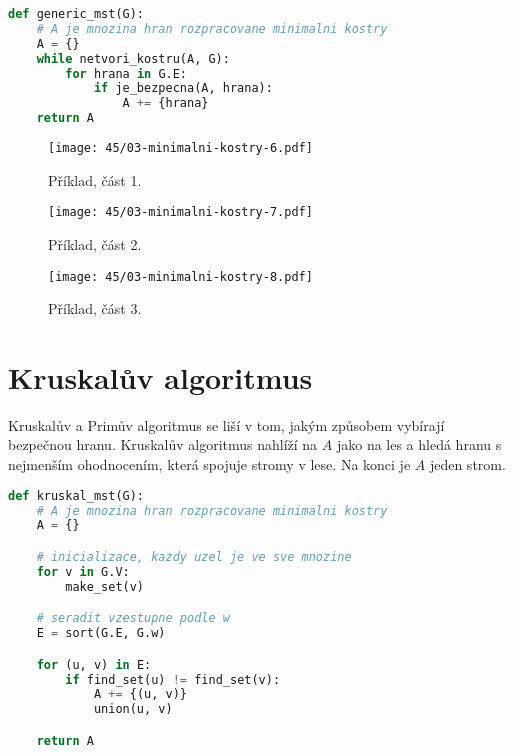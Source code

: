 \bigskip\noindent\begin{minipage}{\linewidth}
\begin{lstlisting}[language=Python, caption={Generický algoritmus. Před každou iterací algoritmu je množina $A$ podmnožinou nějaké minimální kostry. Hrana $(u,v) \in E$ je bezpečná pro $A$, pokud $A \cup \{(u, v)\}$ je podmnožinou nějaké minimální kostry.}]
def generic_mst(G):
    # A je mnozina hran rozpracovane minimalni kostry
    A = {}
    while netvori_kostru(A, G):
        for hrana in G.E:
            if je_bezpecna(A, hrana):
                A += {hrana}
    return A
\end{lstlisting}
\end{minipage}

\begin{figure}[H]
    \centering
    \texttt{[image: 45/03-minimalni-kostry-6.pdf]}
    \caption{Příklad, část 1.}
\end{figure}

\begin{figure}[H]
    \centering
    \texttt{[image: 45/03-minimalni-kostry-7.pdf]}
    \caption{Příklad, část 2.}
\end{figure}

\begin{figure}[H]
    \centering
    \texttt{[image: 45/03-minimalni-kostry-8.pdf]}
    \caption{Příklad, část 3.}
\end{figure}


\section{Kruskalův algoritmus}

Kruskalův a Primův algoritmus se liší v tom, jakým způsobem vybírají bezpečnou hranu. Kruskalův algoritmus nahlíží na $A$ jako na les a hledá hranu s nejmenším ohodnocením, která spojuje stromy v lese. Na konci je $A$ jeden strom.

\bigskip\noindent\begin{minipage}{\linewidth}
\begin{lstlisting}[language=Python, caption={Kruskalův algoritmus. Funkce \texttt{make\_set(v)} vytvoří množinu obsahující $v$, \texttt{find\_set} vrátí reprezentanta množiny $v$, \texttt{union(u ,v)} sjednotí dvě množiny obsahující $u$ a $v$.}]
def kruskal_mst(G):
    # A je mnozina hran rozpracovane minimalni kostry
    A = {}

    # inicializace, kazdy uzel je ve sve mnozine
    for v in G.V:
        make_set(v)

    # seradit vzestupne podle w
    E = sort(G.E, G.w)

    for (u, v) in E:
        if find_set(u) != find_set(v):
            A += {(u, v)}
            union(u, v)

    return A
\end{lstlisting}
\end{minipage}

